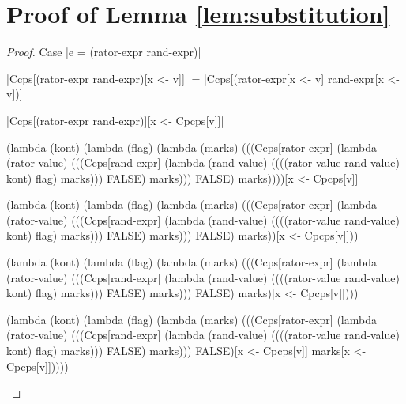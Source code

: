 \chapter{Proof of Lemma \ref{lem:substitution}}
\label{app:substitution}

\begin{proof}{Case \scheme|e = (rator-expr rand-expr)|}

\noindent
\scheme|Ccps[(rator-expr rand-expr)[x <- v]]| = \scheme|Ccps[(rator-expr[x <- v] rand-expr[x <- v])]|

\noindent
\scheme|Ccps[(rator-expr rand-expr)][x <- Cpcps[v]]|

\begin{schemeblock}
\begin{schemedisplay}
(lambda (kont)
   (lambda (flag)
     (lambda (marks)
       (((Ccps[rator-expr]
          (lambda (rator-value)
            (((Ccps[rand-expr]
               (lambda (rand-value)
                 ((((rator-value rand-value) kont) flag) marks)))
              FALSE) marks)))
         FALSE) marks))))[x <- Cpcps[v]]
\end{schemedisplay}
\end{schemeblock}

\begin{schemeblock}
\begin{schemedisplay}
(lambda (kont)
   (lambda (flag)
     (lambda (marks)
       (((Ccps[rator-expr]
          (lambda (rator-value)
            (((Ccps[rand-expr]
               (lambda (rand-value)
                 ((((rator-value rand-value) kont) flag) marks)))
              FALSE) marks)))
         FALSE) marks))[x <- Cpcps[v]]))
\end{schemedisplay}
\end{schemeblock}

\begin{schemeblock}
\begin{schemedisplay}
(lambda (kont)
   (lambda (flag)
     (lambda (marks)
       (((Ccps[rator-expr]
          (lambda (rator-value)
            (((Ccps[rand-expr]
               (lambda (rand-value)
                 ((((rator-value rand-value) kont) flag) marks)))
              FALSE) marks)))
         FALSE) marks)[x <- Cpcps[v]])))
\end{schemedisplay}
\end{schemeblock}

\begin{schemeblock}
\begin{schemedisplay}
(lambda (kont)
   (lambda (flag)
     (lambda (marks)
       (((Ccps[rator-expr]
          (lambda (rator-value)
            (((Ccps[rand-expr]
               (lambda (rand-value)
                 ((((rator-value rand-value) kont) flag) marks)))
              FALSE) marks)))
         FALSE)[x <- Cpcps[v]] marks[x <- Cpcps[v]]))))
\end{schemedisplay}
\end{schemeblock}


\end{proof}
